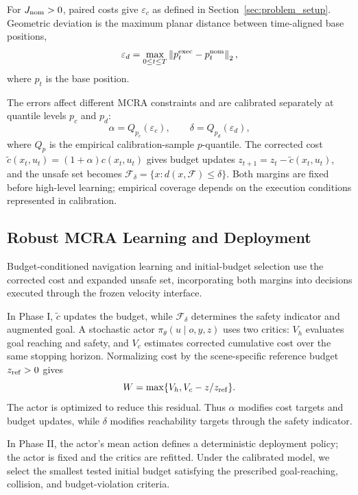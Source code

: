 \documentclass[conference]{IEEEtran}
\begin{document}
For $J_{\rm nom}>0$, paired costs give $\varepsilon_c$ as defined in
Section~\ref{sec:problem_setup}. Geometric deviation is the maximum planar
distance between time-aligned base positions,
\begin{equation}
\varepsilon_d=\max_{0\leq t\leq T} \left\|p_t^{\rm exec}-p_t^{\rm nom}\right\|_2,
\label{eq:max_planar_deviation}
\end{equation}
where $p_t$ is the base position.

The errors affect different MCRA constraints and are calibrated separately at
quantile levels $p_c$ and $p_d$:
\begin{equation}
\alpha=Q_{p_c}(\varepsilon_c),\qquad
\delta=Q_{p_d}(\varepsilon_d),
\label{eq:calibration_margins}
\end{equation}
where $Q_p$ is the empirical calibration-sample $p$-quantile. The corrected cost
$\tilde c(x_t,u_t)=(1+\alpha)c(x_t,u_t)$ gives budget updates
$z_{t+1}=z_t-\tilde c(x_t,u_t)$, and the unsafe set becomes
$\mathcal{F}_\delta=\{x:d(x,\mathcal{F})\leq\delta\}$. Both margins are fixed
before high-level learning; empirical coverage depends on the execution
conditions represented in calibration.

\subsection{Robust MCRA Learning and Deployment}
Budget-conditioned navigation learning and initial-budget selection use the
corrected cost and expanded unsafe set, incorporating both margins into decisions
executed through the frozen velocity interface.

In Phase I, $\tilde c$ updates the budget, while $\mathcal{F}_\delta$ determines
the safety indicator and augmented goal. A stochastic actor
$\pi_\theta(u\mid o,y,z)$ uses two critics: $V_h$ evaluates goal reaching and
safety, and $V_c$ estimates corrected cumulative cost over the same stopping
horizon. Normalizing cost by the scene-specific reference budget
$z_{\rm ref}>0$ gives
\begin{equation}
W=\max\{V_h,V_c-z/z_{\rm ref}\}.
\label{eq:combined_residual}
\end{equation}
The actor is optimized to reduce this residual. Thus $\alpha$ modifies cost targets and budget
updates, while $\delta$ modifies reachability targets through the safety indicator.

In Phase II, the actor's mean action defines a deterministic deployment policy;
the actor is fixed and the critics are refitted. Under the calibrated model,
we select the smallest tested initial budget satisfying the prescribed
goal-reaching, collision, and budget-violation criteria.
\end{document}
